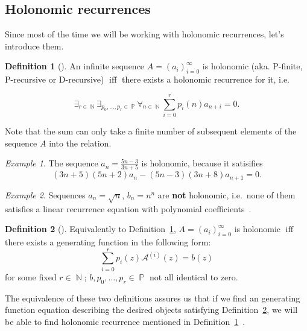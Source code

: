 \documentclass[final]{article}
\theoremstyle{definition}
\newtheorem{definition}{Definition}[subsection]
\theoremstyle{definition}
\theoremstyle{remark}
\newtheorem{example}{Example}[subsection]
\newcommand{\gf}[1]{\ensuremath{\mathcal{#1}}}
\DeclareMathOperator{\textiff}{\text{iff}}
\DeclareMathOperator{\N}{\mathbb{N}}
\DeclareMathOperator{\poly}{\mathbb{P}}
\begin{document}
\subsection{Holonomic recurrences}%
\label{sub:holonomic_recurrences}

Since most of the time we will be working with holonomic recurrences, let's introduce them.

\begin{definition}[\cite{holotoolkit}]
    \label{def:holo_1}
    An infinite sequence \(A = (a_i)_{i=0}^{\infty}\) is holonomic (aka. P-finite, P-recursive or D-recursive) \(\textiff\) there exists a holonomic recurrence for it, i.e.

\[\exists_{r \in \N} \exists_{p_0, \ldots, p_r \in \poly} \forall_{n \in \N} \sum_{i=0}^r p_i(n)a_{n+i} = 0 .\]
\end{definition}

Note that the sum can only take a finite number of subsequent elements of the sequence \(A\) into the relation.

\begin{example}
    The sequence \(a_n = \frac{5n - 3}{3n + 5}\) is holonomic, because it satisifies
    \[(3n + 5)(5n + 2) a_n - (5n - 3)(3n + 8) a_{n+1} = 0 .\]
\end{example}

\begin{example}
    Sequences \(a_n = \sqrt{n}\), \(b_n = n^n\) are \textbf{not} holonomic, i.e.\ none of them satisfies a linear recurrence equation with polynomial coefficients~\cite{nonholo}.
\end{example}

\begin{definition}[\cite{complexity}]
    \label{def:holo_2}
    Equivalently to Definition~\ref{def:holo_1}, \(A = (a_i)_{i=0}^{\infty}\) is holonomic \(\textiff\) there exists a generating function in the following form:
    \[\sum_{i=0}^{r} p_i(z) \gf{A}^{(i)}(z) = b(z)\]
    for some fixed \(r \in \N\); \(b, p_0, \ldots, p_r \in \poly\) not all identical to zero.
\end{definition}

The equivalence of these two definitions assures us that if we find an generating function equation describing the desired objects satisfying Definition~\ref{def:holo_2}, we will be able to find holonomic recurrence mentioned in Definition~\ref{def:holo_1}~\cite{complexity}.
\end{document}
